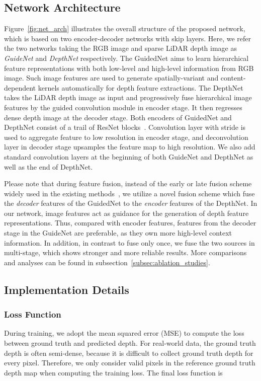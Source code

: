 \documentclass[journal]{IEEEtran}
\begin{document}
\subsection{Network Architecture}
\label{subsec:net_arch}
Figure~\ref{fig:net_arch} illustrates the overall structure of the proposed network, which is based on two encoder-decoder networks with skip layers.
Here, we refer the two networks taking the RGB image  and sparse LiDAR depth image  as \emph{GuideNet} and \emph{DepthNet} respectively.
The GuidedNet aims to learn hierarchical feature representations with both low-level and high-level information from RGB image.
Such image features are used to generate spatially-variant and content-dependent kernels automatically for depth feature extractions.
The DepthNet takes the LiDAR depth image as input and progressively fuse hierarchical image features by the guided convolution module in encoder stage.
It then regresses dense depth image at the decoder stage.
Both encoders of GuidedNet and DepthNet consist of a trail of ResNet blocks~\cite{res_net}.
Convolution layer with stride is used to aggregate feature to low resolution in encoder stage,
and deconvolution layer in decoder stage upsamples the feature map to high resolution.
We also add standard convolution layers at the beginning of both GuideNet and DepthNet as well as the end of DepthNet.  

Please note that during feature fusion, instead of the early or late fusion scheme widely used in the existing methods~\cite{deep_lidar, sparse_noisy, self_supervised},
we utilize a novel fusion scheme which fuse the \emph{decoder} features of the GuidedNet to the \emph{encoder} features of the DepthNet.
In our network, image features act as guidance for the generation of depth feature representations.
Thus, compared with encoder features, features from the decoder stage in the GuideNet are preferable, as they own more high-level context information.
In addition, in contrast to fuse only once,
we fuse the two sources in multi-stage, which shows stronger and more reliable results.
More comparisons and analyses can be found in subsection~\ref{subsec:ablation_studies}.


\subsection{Implementation Details}
\label{subsec:implement_detail}

\subsubsection{Loss Function}
During training, we adopt the mean squared error (MSE) to compute the loss between ground truth and predicted depth.
For real-world data, the ground truth depth is often semi-dense, because it is difficult to collect ground truth depth for every pixel.
Therefore, we only consider valid pixels in the reference ground truth depth map when computing the training loss.
The final loss function is
\end{document}
